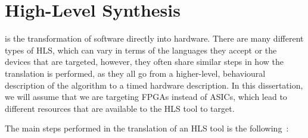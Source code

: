 \section{High-Level Synthesis}%
\label{sec:bg:hls}

 is the transformation of software directly into hardware.
There are many different types of \gls{HLS}, which can vary in terms of the
languages they accept or the devices that are targeted, however, they often
share similar steps in how the translation is performed, as they all go from a
higher-level, behavioural description of the algorithm to a timed hardware
description.  In this dissertation, we will assume that we are targeting
\glspl{FPGA} instead of \glspl{ASIC}, which lead to different resources that are
available to the \gls{HLS} tool to target.

The main steps performed in the translation of an \gls{HLS} tool is the
following~\cite{coussy09_introd_to_high_level_synth,canis13_l}:

